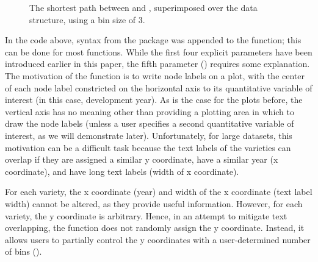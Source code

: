\documentclass[article,shortnames]{jss}
\begin{document}
\begin{figure}%
    \centering
    \caption{The shortest path between  and , superimposed over the data structure, using a bin size of 3.}
    \label{fig:plotTNBin3}
\end{figure}

In the code above, syntax from the  package was appended to the  function; this can be done for most  functions. While the first four explicit parameters have been introduced earlier in this paper, the fifth parameter () requires some explanation. The motivation of the  function is to write node labels on a plot, with the center of each node label constricted on the horizontal axis to its quantitative variable of interest (in this case, development year). As is the case for the plots before, the vertical axis has no meaning other than providing a plotting area in which to draw the node labels (unless a user specifies a second quantitative variable of interest, as we will demonstrate later). Unfortunately, for large datasets, this motivation can be a difficult task because the text labels of the varieties can overlap if they are assigned a similar y coordinate, have a similar year (x coordinate), and have long text labels (width of x coordinate).

For each variety, the x coordinate (year) and width of the x coordinate (text label width) cannot be altered, as they provide useful information. However, for each variety, the y coordinate is arbitrary. Hence, in an attempt to mitigate text overlapping, the  function does not randomly assign the y coordinate. Instead, it allows users to partially control the y coordinates with a user-determined number of bins ().
\end{document}
